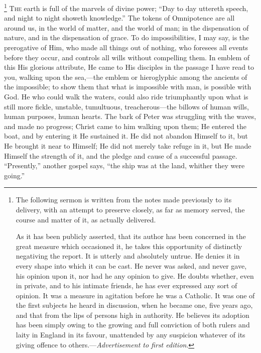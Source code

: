 \footnote{The following sermon is written
from the notes made previously to its delivery, with an
attempt to preserve closely, as far as memory served, the
course and matter of it, as actually delivered.

As it has been publicly asserted, that its author has
been concerned in the great measure which occasioned it,
he takes this opportunity of distinctly negativing the
report. It is utterly and absolutely untrue. He denies it
in every shape into which it can be cast. He never was
asked, and never gave, his opinion upon it, nor had he
any opinion to give. He doubts whether, even in private,
and to his intimate friends, he has ever expressed any
sort of opinion. It was a measure in agitation before he
was a Catholic. It was one of the first subjects he heard
in discussion, when he became one, five years ago, and
that from the lips of persons high in authority. He
believes its adoption has been simply owing to the
growing and full conviction of both rulers and laity in
England in its favour, unattended by any suspicion
whatever of its giving offence to
others.—\emph{Advertisement to first edition}.}
T\textsc{he} earth is full of the marvels of divine power;
``Day to day uttereth speech, and night to night
showeth knowledge.'' The tokens of Omnipotence are
all around us, in the world of matter, and the world of
man; in the dispensation of nature, and in the
dispensation of grace. To do impossibilities, I may say,
is the prerogative of Him, who made all things out of
nothing, who foresees all events before they occur, and
controls all wills without compelling them. In emblem of
this His glorious attribute, He came to His disciples in
the passage I have read to you, walking upon the
sea,—the emblem or hieroglyphic among the ancients
of the impossible; to show them that what is impossible
with man, is possible with God. He who could walk the
waters, could also ride triumphantly upon what is still
more fickle, unstable, tumultuous, treacherous—the
billows of human wills, human purposes, human hearts. The
bark of Peter was struggling with the waves, and made no
progress; Christ came to him walking upon them; He
entered the boat, and by entering it He sustained it. He
did not abandon Himself to it, but He brought it near to
Himself; He did not merely take refuge in it, but He made
Himself the strength of it, and the pledge and cause of a
successful passage. ``Presently,'' another gospel
says, ``the ship was at the land, whither they were
going.''

